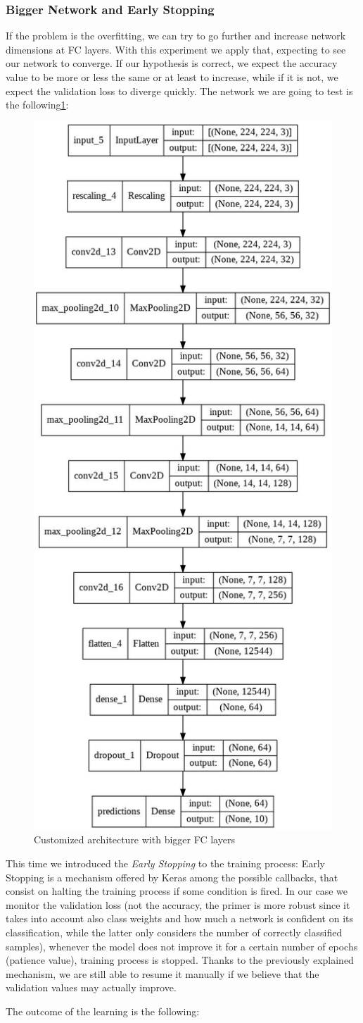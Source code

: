 \subsubsection{Bigger Network and Early Stopping}
If the problem is the overfitting, we can try to go further and increase network dimensions at FC layers. With this experiment we apply that, expecting to see our network to converge. If our hypothesis is correct, we expect the accuracy value to be more or less the same or at least to increase, while if it is not, we expect the validation loss to diverge quickly. The network we are going to test is the following\ref{fig:BiggerCNN}:

\begin{figure}[H]
	\centering
	\includegraphics[height=0.5\textwidth]{img/scratch/BiggerCNN.jpg}
	\caption{Customized architecture with bigger FC layers}
	\label{fig:BiggerCNN}
\end{figure}

\noindent This time we introduced the \textit{Early Stopping} to the training process: Early Stopping is a mechanism offered by Keras among the possible callbacks, that consist on halting the training process if some condition is fired. In our case we monitor the validation loss (not the accuracy, the primer is more robust since it takes into account also class weights and how much a network is confident on its classification, while the latter only considers the number of correctly classified samples), whenever the model does not improve it for a certain number of epochs (patience value), training process is stopped. Thanks to the previously explained mechanism, we are still able to resume it manually if we believe that the validation values may actually improve.

\noindent The outcome of the learning is the following:

\medskip


